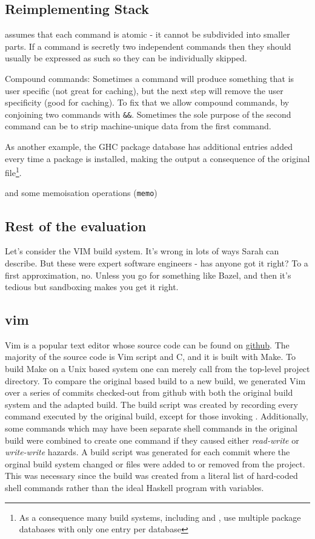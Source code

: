\subsection{Reimplementing Stack}

\Rattle assumes that each command is atomic - it cannot be subdivided into smaller parts. If a command is secretly two independent commands then they should usually be expressed as such so they can be individually skipped.

Compound commands: Sometimes a command will produce something that is user specific (not great for caching), but the next step will remove the user specificity (good for caching). To fix that we allow compound commands, by conjoining two commands with \texttt{\&\&}. Sometimes the sole purpose of the second command can be to strip machine-unique data from the first command.

As another example, the GHC package database has additional entries added every time a package is installed, making the output a consequence of the original file\footnote{As a consequence many build systems, including \Bazel and \Rattle, use multiple package databases with only one entry per database}.

and some memoisation operations (\texttt{memo})

\subsection{Rest of the evaluation}

Let's consider the VIM build system. It's wrong in lots of ways Sarah can describe. But these were expert software engineers - has anyone got it right? To a first approximation, no. Unless you go for something like Bazel, and then it's tedious but sandboxing makes you get it right.


\subsection{vim}

Vim is a popular text editor whose source code can be found on \href{https://github.com/vim/vim}{github}.  The majority of the source code is Vim script and C, and it is built with Make.  To build Make on a Unix based system one can merely call \Make from the top-level project directory.  To compare the original \Make based build to a new \Rattle build, we generated Vim over a series of commits checked-out from github with both the original build system and the adapted \Rattle build.  The \Rattle build script was created by recording every command executed by the original build, except for those invoking \Make.  Additionally, some commands which may have been separate shell commands in the original build were combined to create one command if they caused either \emph{read-write} or \emph{write-write} hazards.  A \Rattle build script was generated for each commit where the orginal build system changed or files were added to or removed from the project.  This was necessary since the \Rattle build was created from a literal list of hard-coded shell commands rather than the ideal Haskell program with variables.

